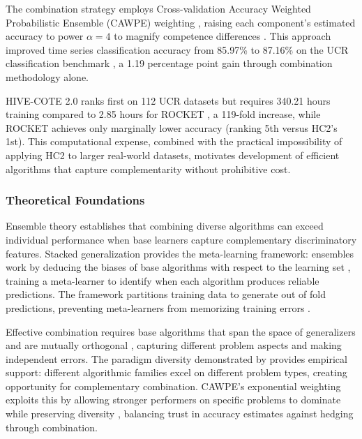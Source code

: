\documentclass[pdflatex,sn-basic]{sn-jnl}           %
\theoremstyle{thmstyleone}%
\theoremstyle{thmstyletwo}%
\theoremstyle{thmstylethree}%
\begin{document}
The combination strategy employs Cross-validation Accuracy Weighted Probabilistic Ensemble (CAWPE) weighting \citep{cawpe}, raising each component's estimated accuracy to power $\alpha=4$ to magnify competence differences \citep[p.~1675]{cawpe}. This approach improved time series classification accuracy from 85.97\% to 87.16\% on the UCR classification benchmark \citep[Figure~8, p.~1692]{cawpe}, a 1.19 percentage point gain through combination methodology alone.

HIVE-COTE 2.0 ranks first on 112 UCR datasets \citep[p.~3]{hive-cote-2} but requires 340.21 hours training compared to 2.85 hours for ROCKET \citep[Table~4, p.~18]{hive-cote-2}, a 119-fold increase, while ROCKET achieves only marginally lower accuracy (ranking 5th versus HC2's 1st). This computational expense, combined with the practical impossibility of applying HC2 to larger real-world datasets, motivates development of efficient algorithms that capture complementarity without prohibitive cost.

\subsubsection{Theoretical Foundations}

Ensemble theory establishes that combining diverse algorithms can exceed individual performance when base learners capture complementary discriminatory features. Stacked generalization \citep{stacked-generalization} provides the meta-learning framework: ensembles work by deducing the biases of base algorithms with respect to the learning set \citep[p.~241]{stacked-generalization}, training a meta-learner to identify when each algorithm produces reliable predictions. The framework partitions training data to generate out of fold predictions, preventing meta-learners from memorizing training errors \citep[p.~244]{stacked-generalization}.

Effective combination requires base algorithms that span the space of generalizers and are mutually orthogonal \citep[p.~256]{stacked-generalization}, capturing different problem aspects and making independent errors. The paradigm diversity demonstrated by \citet[Table~11, p.~648]{tsc-bakeoff} provides empirical support: different algorithmic families excel on different problem types, creating opportunity for complementary combination. CAWPE's exponential weighting exploits this by allowing stronger performers on specific problems to dominate while preserving diversity \citep[p.~1675]{cawpe}, balancing trust in accuracy estimates against hedging through combination.
\end{document}
